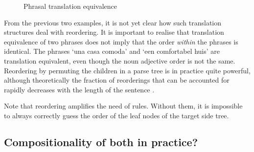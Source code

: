 \documentclass{report}
\theoremstyle{break}
\begin{document}
\begin{figure}[!ht]
\centering
{}
\caption{Phrasal translation equivalence}\label{fig:phrasal}
\end{figure}

From the previous two examples, it is not yet clear how such translation structures deal with reordering. It is important to realise that translation equivalence of two phrases does not imply that the order \textit{within} the phrases is identical. The phrases `una casa comoda' and `een comfortabel huis' are translation equivalent, even though the noun adjective order is not the same. Reordering by permuting the children in a parse tree is in practice quite powerful, although theoretically the fraction of reorderings that can be accounted for rapidly decreases with the length of the sentence \citep{satta2005some}.

Note that reordering amplifies the need of rules. Without them, it is impossible to always correctly guess the order of the leaf nodes of the target side tree.





\subsection{Compositionality of both in practice?}
\end{document}
